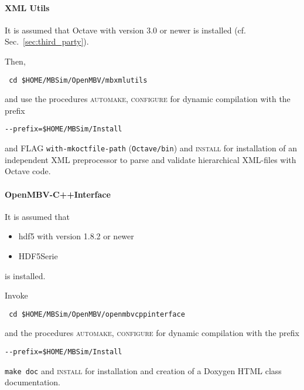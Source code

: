 \paragraph{XML Utils}
It is assumed that Octave with version 3.0 or newer is installed (cf. Sec.~\ref{sec:third_party}).\par
Then,
\begin{verbatim}
 cd $HOME/MBSim/OpenMBV/mbxmlutils
\end{verbatim} 
and use the procedures \textsc{automake}, \textsc{configure} for dynamic compilation with the prefix
\begin{verbatim}
--prefix=$HOME/MBSim/Install
\end{verbatim}
and FLAG \texttt{\-\-with-mkoctfile-path} (\texttt{Octave/bin}) and \textsc{install} for installation of an independent XML preprocessor to parse and validate hierarchical XML-files with Octave code.

\paragraph{OpenMBV-C++Interface}
It is assumed that 
\begin{itemize}
\item hdf5 with version 1.8.2 or newer
\item HDF5Serie 
\end{itemize}
is installed.\par
Invoke
\begin{verbatim}
 cd $HOME/MBSim/OpenMBV/openmbvcppinterface
\end{verbatim} 
and the procedures \textsc{automake, configure} for dynamic compilation with the prefix
\begin{verbatim}
--prefix=$HOME/MBSim/Install
\end{verbatim}
\texttt{make doc} and \textsc{install} for installation and creation of a Doxygen HTML class documentation. 


